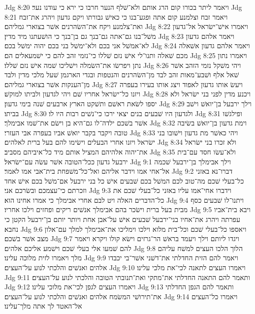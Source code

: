 Jdg 8:20  ויאמר ליתר בכורו קום הרג אותם ולא־שׁלף הנער חרבו כי ירא כי עודנו נער׃
Jdg 8:21  ויאמר זבח וצלמנע קום אתה ופגע־בנו כי כאישׁ גבורתו ויקם גדעון ויהרג את־זבח ואת־צלמנע ויקח את־השׂהרנים אשׁר בצוארי גמליהם׃
Jdg 8:22  ויאמרו אישׁ־ישׂראל אל־גדעון משׁל־בנו גם־אתה גם־בנך גם בן־בנך כי הושׁעתנו מיד מדין׃
Jdg 8:23  ויאמר אלהם גדעון לא־אמשׁל אני בכם ולא־ימשׁל בני בכם יהוה ימשׁל בכם׃
Jdg 8:24  ויאמר אלהם גדעון אשׁאלה מכם שׁאלה ותנו־לי אישׁ נזם שׁללו כי־נזמי זהב להם כי ישׁמעאלים הם׃
Jdg 8:25  ויאמרו נתון נתן ויפרשׂו את־השׂמלה וישׁליכו שׁמה אישׁ נזם שׁללו׃
Jdg 8:26  ויהי משׁקל נזמי הזהב אשׁר שׁאל אלף ושׁבע־מאות זהב לבד מן־השׂהרנים והנטפות ובגדי הארגמן שׁעל מלכי מדין ולבד מן־הענקות אשׁר בצוארי גמליהם׃
Jdg 8:27  ויעשׂ אותו גדעון לאפוד ויצג אותו בעירו בעפרה ויזנו כל־ישׂראל אחריו שׁם ויהי לגדעון ולביתו למוקשׁ׃
Jdg 8:28  ויכנע מדין לפני בני ישׂראל ולא יספו לשׂאת ראשׁם ותשׁקט הארץ ארבעים שׁנה בימי גדעון׃
Jdg 8:29  וילך ירבעל בן־יואשׁ וישׁב בביתו׃
Jdg 8:30  ולגדעון היו שׁבעים בנים יצאי ירכו כי־נשׁים רבות היו לו׃
Jdg 8:31  ופילגשׁו אשׁר בשׁכם ילדה־לו גם־היא בן וישׂם את־שׁמו אבימלך׃
Jdg 8:32  וימת גדעון בן־יואשׁ בשׂיבה טובה ויקבר בקבר יואשׁ אביו בעפרה אבי העזרי׃
Jdg 8:33  ויהי כאשׁר מת גדעון וישׁובו בני ישׂראל ויזנו אחרי הבעלים וישׂימו להם בעל ברית לאלהים׃
Jdg 8:34  ולא זכרו בני ישׂראל את־יהוה אלהיהם המציל אותם מיד כל־איביהם מסביב׃
Jdg 8:35  ולא־עשׂו חסד עם־בית ירבעל גדעון ככל־הטובה אשׁר עשׂה עם־ישׂראל׃
Jdg 9:1  וילך אבימלך בן־ירבעל שׁכמה אל־אחי אמו וידבר אליהם ואל־כל־משׁפחת בית־אבי אמו לאמר׃
Jdg 9:2  דברו־נא באזני כל־בעלי שׁכם מה־טוב לכם המשׁל בכם שׁבעים אישׁ כל בני ירבעל אם־משׁל בכם אישׁ אחד וזכרתם כי־עצמכם ובשׂרכם אני׃
Jdg 9:3  וידברו אחי־אמו עליו באזני כל־בעלי שׁכם את כל־הדברים האלה ויט לבם אחרי אבימלך כי אמרו אחינו הוא׃
Jdg 9:4  ויתנו־לו שׁבעים כסף מבית בעל ברית וישׂכר בהם אבימלך אנשׁים ריקים ופחזים וילכו אחריו׃
Jdg 9:5  ויבא בית־אביו עפרתה ויהרג את־אחיו בני־ירבעל שׁבעים אישׁ על־אבן אחת ויותר יותם בן־ירבעל הקטן כי נחבא׃
Jdg 9:6  ויאספו כל־בעלי שׁכם וכל־בית מלוא וילכו וימליכו את־אבימלך למלך עם־אלון מצב אשׁר בשׁכם׃
Jdg 9:7  ויגדו ליותם וילך ויעמד בראשׁ הר־גרזים וישׂא קולו ויקרא ויאמר להם שׁמעו אלי בעלי שׁכם וישׁמע אליכם אלהים׃
Jdg 9:8  הלוך הלכו העצים למשׁח עליהם מלך ויאמרו לזית מלוכה עלינו׃
Jdg 9:9  ויאמר להם הזית החדלתי את־דשׁני אשׁר־בי יכבדו אלהים ואנשׁים והלכתי לנוע על־העצים׃
Jdg 9:10  ויאמרו העצים לתאנה לכי־את מלכי עלינו׃
Jdg 9:11  ותאמר להם התאנה החדלתי את־מתקי ואת־תנובתי הטובה והלכתי לנוע על־העצים׃
Jdg 9:12  ויאמרו העצים לגפן לכי־את מלוכי עלינו׃
Jdg 9:13  ותאמר להם הגפן החדלתי את־תירושׁי המשׂמח אלהים ואנשׁים והלכתי לנוע על־העצים׃
Jdg 9:14  ויאמרו כל־העצים אל־האטד לך אתה מלך־עלינו׃
